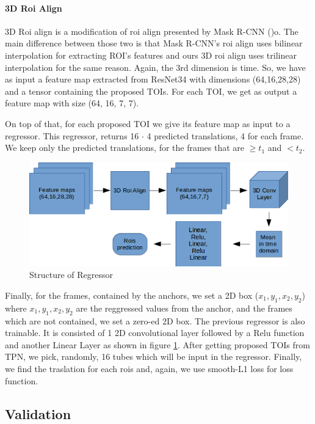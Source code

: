 \documentclass{report}
\begin{document}
\paragraph{3D Roi Align}
3D Roi align is a modification of roi align presented by Mask R-CNN (\cite{DBLP:journals/corr/HeGDG17})o. The main difference between those two is that Mask R-CNN's roi align uses
bilinear interpolation for extracting ROI's features and ours 3D roi align uses trilinear interpolation for the same reason. Again, the 3rd dimension is
time.
So, we have as input a feature map extracted from ResNet34 with dimensions (64,16,28,28) and a tensor containing the proposed TOIs.
For each TOI, we get as output a feature map with size (64, 16, 7, 7). \par
On top of that, for each proposed TOI we give its feature map as input to a regressor. This regressor, returns 16 $\cdot$ 4 predicted translations, 4 for each frame.
We keep only the predicted translations, for the frames that are $\ge t_1$ and $< t_2$. 
\begin{figure}[h]
  \centering
  \includegraphics[scale=0.5]{regressor_1_3d}
  \caption{Structure of Regressor}
  \label{fig:regressor_3d}
\end{figure}

Finally, for the frames, contained by the anchors, we set a 2D box ($x_1,y_1,x_2,y_2$) where $x_1, y_1, x_2, y_2$ are the reggressed values from the anchor,
and the frames which are not contained, we set a zero-ed 2D box. The previous regressor is also trainable. It is consisted of 1 2D convolutional layer followed by a
Relu function and another Linear Layer as shown in figure \ref{fig:regressor_3d}. After getting proposed TOIs from TPN, we pick, randomly, 16 tubes which will be input in the regressor.
Finally, we find the traslation for each rois and, again, we use smooth-L1 loss for loss function.\par

\subsection{Validation}
\end{document}
